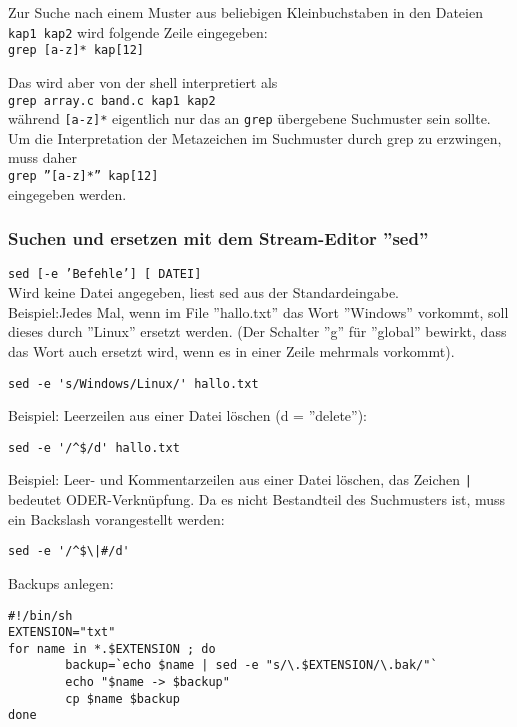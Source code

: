 \documentclass[11pt]{article}
\begin{document}
Zur Suche nach einem Muster aus beliebigen Kleinbuchstaben in den
Dateien \texttt{kap1 kap2} wird folgende Zeile eingegeben:\\
\texttt{grep [a-z]* kap[12]}

Das wird aber von der shell interpretiert als\\
\texttt{grep array.c band.c kap1 kap2} \\
während \texttt{[a-z]*} eigentlich nur das an \texttt{grep} übergebene
Suchmuster sein sollte. Um die Interpretation der Metazeichen im
Suchmuster durch grep zu erzwingen, muss daher\\
\texttt{grep ''[a-z]*'' kap[12]}\\
eingegeben werden.\\

\subsubsection{Suchen und ersetzen mit dem Stream-Editor ''sed''}

\texttt{sed [-e 'Befehle'] [ DATEI]} \\
Wird keine Datei angegeben, liest sed aus der Standardeingabe.\\

Beispiel:Jedes Mal, wenn im File ''hallo.txt'' das Wort ''Windows'' vorkommt,
soll dieses durch ''Linux'' ersetzt werden. (Der Schalter ''g'' für ''global''
bewirkt, dass das Wort auch ersetzt wird, wenn es in einer Zeile mehrmals vorkommt).
\begin{verbatim}
sed -e 's/Windows/Linux/' hallo.txt
\end{verbatim}

Beispiel: Leerzeilen aus einer Datei löschen (d = ''delete''):
\begin{verbatim}
sed -e '/^$/d' hallo.txt
\end{verbatim}

Beispiel: Leer- und Kommentarzeilen aus einer Datei löschen, das Zeichen \texttt{|} 
bedeutet ODER-Verknüpfung. Da es nicht Bestandteil des Suchmusters ist, muss ein 
Backslash vorangestellt werden:
\begin{verbatim}
sed -e '/^$\|#/d'
\end{verbatim}

Backups anlegen:
\begin{verbatim}
#!/bin/sh
EXTENSION="txt"
for name in *.$EXTENSION ; do
        backup=`echo $name | sed -e "s/\.$EXTENSION/\.bak/"`
        echo "$name -> $backup"
        cp $name $backup
done
\end{verbatim}
\end{document}

